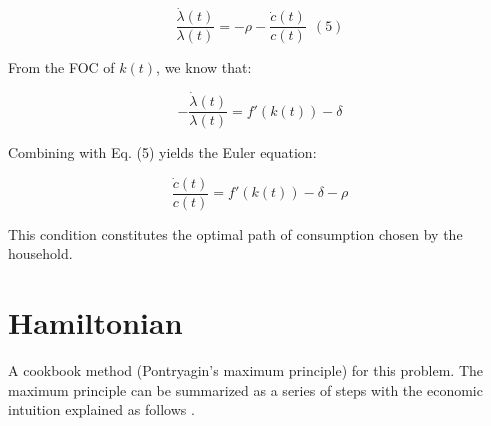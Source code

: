 \documentclass[11pt,a4paper]{book}
\theoremstyle{definition}\newtheorem{definition}{Definition}
\theoremstyle{definition}\newtheorem{fact}{Fact}
\theoremstyle{definition}\newtheorem{remark}{Remark}
\theoremstyle{definition}\newtheorem{ex}{Ex.}
\theoremstyle{definition}\newtheorem{project}{Project}
\theoremstyle{definition}\newtheorem{problem}{Problem}
\theoremstyle{definition}\newtheorem{example}{Example}
\numberwithin{theorem}{section}
\numberwithin{corollary}{chapter}
\numberwithin{assumption}{chapter}
\numberwithin{definition}{chapter}
\numberwithin{prop}{chapter}
\numberwithin{notation}{chapter}
\numberwithin{problem}{chapter}
\numberwithin{example}{chapter}
\numberwithin{fact}{chapter}
\numberwithin{ex}{chapter}
\begin{document}
$$
    \frac{\dot{\lambda}(t)}{\lambda(t)} = -\rho - \frac{\dot{c}(t)}{c(t)} \ \ (5)
$$

From the FOC of $k(t)$, we know that:

$$
    - \frac{\dot{\lambda}(t)}{\lambda(t)} = f'(k(t)) - \delta
$$

Combining with Eq. (5) yields the Euler equation:

$$
\frac{\dot{c}(t)}{c(t)} = f'(k(t)) - \delta -\rho
$$

This condition constitutes the optimal path of consumption chosen by the household.

	\section{Hamiltonian}
	A cookbook method (Pontryagin’s maximum principle) for this problem.
		The maximum principle can be summarized as a series of steps with the economic intuition explained as follows \citep{campante2021advanced}.
\end{document}
